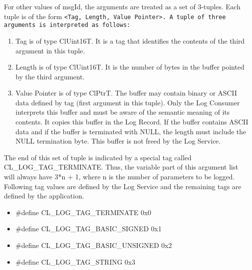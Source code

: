 \begin{flushleft}
\begin{Desc}
\begin{description}
\par
For other values of msgId, the arguments are treated as a set of 3-tuples. Each tuple is of the form \tt{<Tag, Length, Value Pointer>}. A tuple of three
arguments is interpreted as follows:
\begin{enumerate}
\item
Tag is of type ClUint16T. It is a tag that identifies the contents of the third argument in this tuple.
\item
Length is of type ClUint16T. It is the number of bytes in the buffer pointed by the third argument.
\item
Value Pointer is of type ClPtrT. The buffer may contain binary or ASCII data defined by tag (first argument in this tuple). Only the Log Consumer 
interprets this buffer and must be aware of the semantic meaning of its contents. It copies this buffer in the Log Record. If the buffer contains ASCII
data and if the buffer is terminated with NULL, the length must include the NULL termination byte. This buffer is not freed by the Log Service.
\end{enumerate}
The end of this set of tuple is indicated by a special tag called CL\_\-LOG\_\-TAG\_\-TERMINATE. Thus, the variable part of this argument list will always have 
3*n + 1, where n is the number of parameters to be logged. Following tag values are defined by the Log Service and the remaining tags are defined by the
application.
\begin{itemize}
\item
\#define CL\_\-LOG\_\-TAG\_\-TERMINATE		0x0
\item
\#define CL\_\-LOG\_\-TAG\_\-BASIC\_\-SIGNED		0x1
\item
\#define CL\_\-LOG\_\-TAG\_\-BASIC\_\-UNSIGNED	0x2
\item
\#define CL\_\-LOG\_\-TAG\_\-STRING		0x3
\end{itemize}


\end{description}
\end{Desc}
\end{flushleft}
